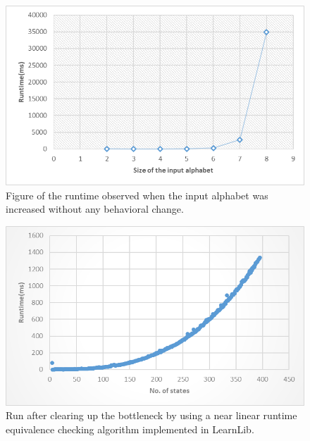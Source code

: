 \begin{figure}
	\centering
	\includegraphics[width=0.7\linewidth]{figures/inputruntime}
	\caption{Figure of the runtime observed when the input alphabet was increased without any behavioral change.}
	\label{fig:inputruntime}
\end{figure}

\begin{figure}
	\centering
	\includegraphics[width=0.7\linewidth]{figures/inputruntime1}
	\caption{Run after clearing up the bottleneck by using a near linear runtime equivalence checking algorithm implemented in LearnLib.}
	\label{fig:inputruntime1}
\end{figure}
